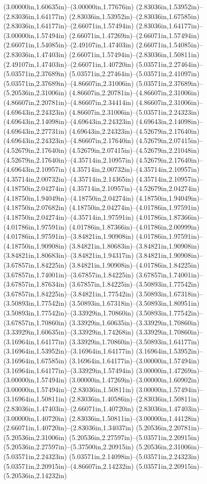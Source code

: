 (3.00000in,1.60635in)--(3.00000in,1.77676in) (2.83036in,1.53952in)--(2.83036in,1.64177in) (2.83036in,1.53952in)--(2.83036in,1.67585in) (2.83036in,1.64177in)--(2.66071in,1.57494in) (2.83036in,1.64177in)--(3.00000in,1.57494in) (2.66071in,1.47269in)--(2.66071in,1.57494in) (2.66071in,1.54085in)--(2.49107in,1.47403in) (2.66071in,1.54085in)--(2.83036in,1.47403in) (2.66071in,1.57494in)--(2.83036in,1.50811in) (2.49107in,1.47403in)--(2.66071in,1.40720in) (5.03571in,2.27464in)--(5.03571in,2.37689in) (5.03571in,2.27464in)--(5.03571in,2.41097in) (5.03571in,2.37689in)--(4.86607in,2.31006in) (5.03571in,2.37689in)--(5.20536in,2.31006in) (4.86607in,2.20781in)--(4.86607in,2.31006in) (4.86607in,2.20781in)--(4.86607in,2.34414in) (4.86607in,2.31006in)--(4.69643in,2.24323in) (4.86607in,2.31006in)--(5.03571in,2.24323in) (4.69643in,2.14098in)--(4.69643in,2.24323in) (4.69643in,2.14098in)--(4.69643in,2.27731in) (4.69643in,2.24323in)--(4.52679in,2.17640in) (4.69643in,2.24323in)--(4.86607in,2.17640in) (4.52679in,2.07415in)--(4.52679in,2.17640in) (4.52679in,2.07415in)--(4.52679in,2.21048in) (4.52679in,2.17640in)--(4.35714in,2.10957in) (4.52679in,2.17640in)--(4.69643in,2.10957in) (4.35714in,2.00732in)--(4.35714in,2.10957in) (4.35714in,2.00732in)--(4.35714in,2.14365in) (4.35714in,2.10957in)--(4.18750in,2.04274in) (4.35714in,2.10957in)--(4.52679in,2.04274in) (4.18750in,1.94049in)--(4.18750in,2.04274in) (4.18750in,1.94049in)--(4.18750in,2.07682in) (4.18750in,2.04274in)--(4.01786in,1.97591in) (4.18750in,2.04274in)--(4.35714in,1.97591in) (4.01786in,1.87366in)--(4.01786in,1.97591in) (4.01786in,1.87366in)--(4.01786in,2.00999in) (4.01786in,1.97591in)--(3.84821in,1.90908in) (4.01786in,1.97591in)--(4.18750in,1.90908in) (3.84821in,1.80683in)--(3.84821in,1.90908in) (3.84821in,1.80683in)--(3.84821in,1.94317in) (3.84821in,1.90908in)--(3.67857in,1.84225in) (3.84821in,1.90908in)--(4.01786in,1.84225in) (3.67857in,1.74001in)--(3.67857in,1.84225in) (3.67857in,1.74001in)--(3.67857in,1.87634in) (3.67857in,1.84225in)--(3.50893in,1.77542in) (3.67857in,1.84225in)--(3.84821in,1.77542in) (3.50893in,1.67318in)--(3.50893in,1.77542in) (3.50893in,1.67318in)--(3.50893in,1.80951in) (3.50893in,1.77542in)--(3.33929in,1.70860in) (3.50893in,1.77542in)--(3.67857in,1.70860in) (3.33929in,1.60635in)--(3.33929in,1.70860in) (3.33929in,1.60635in)--(3.33929in,1.74268in) (3.33929in,1.70860in)--(3.16964in,1.64177in) (3.33929in,1.70860in)--(3.50893in,1.64177in) (3.16964in,1.53952in)--(3.16964in,1.64177in) (3.16964in,1.53952in)--(3.16964in,1.67585in) (3.16964in,1.64177in)--(3.00000in,1.57494in) (3.16964in,1.64177in)--(3.33929in,1.57494in) (3.00000in,1.47269in)--(3.00000in,1.57494in) (3.00000in,1.47269in)--(3.00000in,1.60902in) (3.00000in,1.57494in)--(2.83036in,1.50811in) (3.00000in,1.57494in)--(3.16964in,1.50811in) (2.83036in,1.40586in)--(2.83036in,1.50811in) (2.83036in,1.47403in)--(2.66071in,1.40720in) (2.83036in,1.47403in)--(3.00000in,1.40720in) (2.83036in,1.50811in)--(3.00000in,1.44128in) (2.66071in,1.40720in)--(2.83036in,1.34037in) (5.20536in,2.20781in)--(5.20536in,2.31006in) (5.20536in,2.27597in)--(5.03571in,2.20915in) (5.20536in,2.27597in)--(5.37500in,2.20915in) (5.20536in,2.31006in)--(5.03571in,2.24323in) (5.03571in,2.14098in)--(5.03571in,2.24323in) (5.03571in,2.20915in)--(4.86607in,2.14232in) (5.03571in,2.20915in)--(5.20536in,2.14232in) 